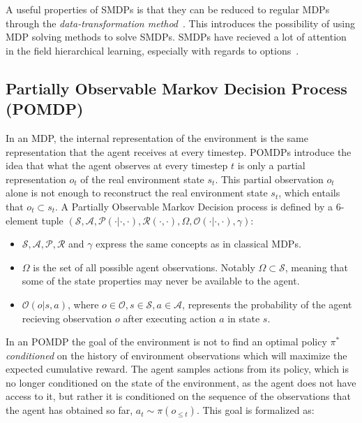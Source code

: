 \documentclass{../main.tex}{}
\begin{document}

A useful properties of SMDPs is that they can be reduced to regular MDPs through the \textit{data-transformation method}~\citep{Piunovskiy2012}. This introduces the possibility of using MDP solving methods to solve SMDPs. SMDPs have recieved a lot of attention in the field hierarchical learning, especially with regards to options~\citep{Sutton1998}.

\subsection{Partially Observable Markov Decision Process (POMDP)}
In an MDP, the internal representation of the environment is the same representation that the agent receives at every timestep. POMDPs introduce the idea that what the agent observes at every timestep $t$ is only a partial representation $o_t$ of the real environment state $s_t$. This partial observation $o_t$ alone is not enough to reconstruct the real environment state $s_t$, which entails that $o_t \subset s_t$. A Partially Observable Markov Decision process is defined by a 6-element tuple $(\mathcal{S}, \mathcal{A}, \mathcal{P}(\cdot | \cdot, \cdot), \mathcal{R}(\cdot, \cdot), \Omega, \mathcal{O}(\cdot | \cdot, \cdot), \gamma)$:

\begin{itemize}
    \item $\mathcal{S}, \mathcal{A}, \mathcal{P}, \mathcal{R}$ and $\gamma$ express the same concepts as in classical MDPs.
    \item $\Omega$ is the set of all possible agent observations. Notably $\Omega \subset \mathcal{S}$, meaning that some of the state properties may never be available to the agent.
    \item $\mathcal{O}(o | s, a)$, where $o \in \mathcal{O}, s \in \mathcal{S}, a \in \mathcal{A}$, represents the probability of the agent recieving observation $o$ after executing action $a$ in state $s$. 
\end{itemize}

In an POMDP the goal of the environment is not to find an optimal policy $\pi^*$ \textit{conditioned} on the history of environment observations which will maximize the expected cumulative reward. The agent samples actions from its policy, which is no longer conditioned on the state of the environment, as the agent does not have access to it, but rather it is conditioned on the sequence of the observations that the agent has obtained so far, $a_t \sim \pi(o_{\leq t})$. This goal is formalized as:
\end{document}
